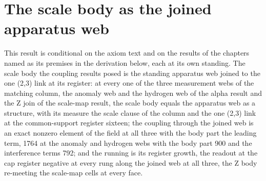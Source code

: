 \section{The scale body as the joined apparatus web}\label{mod:V-7-D538156-sbjw-t1}
\begin{chconditional}\label{box:V-7-D538156-sbjw-t1:1}
This result is conditional on the axiom text and on the results of the chapters named as its premises in the derivation below, each at its own standing.
The scale body the coupling results posed is the standing apparatus web joined to the one (2,3) link at its register: at every one of the three measurement webs of the matching column, the anomaly web and the hydrogen web of the alpha result and the Z join of the scale-map result, the scale body equals the apparatus web as a structure, with its measure the scale clause of the column and the one (2,3) link at the common-support register sixteen; the coupling through the joined web is an exact nonzero element of the field at all three with the body part the leading term, 1764 at the anomaly and hydrogen webs with the body part 900 and the interference terms 792; and the running is its register growth, the readout at the cap register negative at every rung along the joined web at all three, the Z body re-meeting the scale-map cells at every face.
\end{chconditional}
